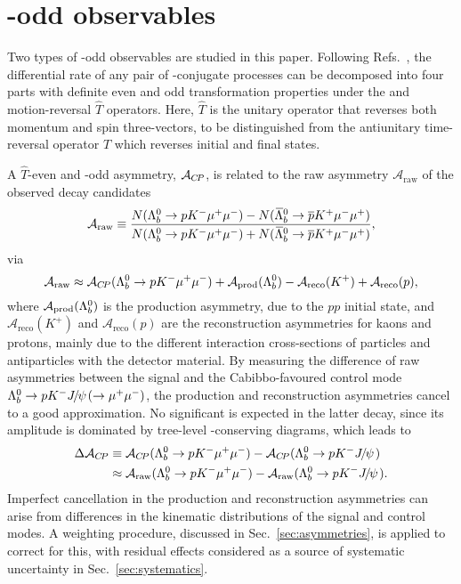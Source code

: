 \section{\boldmath\CP-odd observables}
\label{sec:cpv}
Two types of \CP-odd observables are studied in this paper. Following Refs.~\cite{Durieux:2015zwa,LHCb-PAPER-2016-030}, the differential rate of any pair of \CP-conjugate processes can be decomposed into four parts with definite even and odd transformation properties under the \CP and motion-reversal $\widehat{T}$ operators. Here, $\widehat{T}$ is the unitary operator that reverses both momentum and spin
three-vectors, to be distinguished from the antiunitary time-reversal operator $T$ which reverses initial and final states.

A $\widehat{T}$-even and \CP-odd asymmetry, $\mathcal{A}_{{C\!P}}$, is related to the raw asymmetry $\mathcal{A}_{\text{raw}}$ of the observed decay candidates
\begin{equation}
\mathcal{A}_{\text{raw}} \equiv \frac{N({{\Lambda}^0_{b}} \rightarrow {\ensuremath{p}}{\ensuremath{{K}^-}}{\ensuremath{\mu^+}}{\ensuremath{\mu^-}})-N({{\kern 0.1em\overline{\kern -0.1em\Lambda}}{}^0_{b}} \rightarrow {\ensuremath{\overline {{p}}}}{\ensuremath{{K}^+}}{\ensuremath{\mu^-}}{\ensuremath{\mu^+}} )}{N({{\Lambda}^0_{b}} \rightarrow {\ensuremath{p}}{\ensuremath{{K}^-}}{\ensuremath{\mu^+}}{\ensuremath{\mu^-}})+N({{\kern 0.1em\overline{\kern -0.1em\Lambda}}{}^0_{b}} \rightarrow {\ensuremath{\overline {{p}}}}{\ensuremath{{K}^+}}{\ensuremath{\mu^-}}{\ensuremath{\mu^+}} )},
\end{equation}
via
\begin{equation}
\mathcal{A}_{\text{raw}} \approx \mathcal{A}_{{C\!P}}({{\Lambda}^0_{b}} \rightarrow {\ensuremath{p}}{\ensuremath{{K}^-}}{\ensuremath{\mu^+}}{\ensuremath{\mu^-}}) + \mathcal{A}_{\text{prod}}({{\Lambda}^0_{b}}) - \mathcal{A}_{\text{reco}}(K^+) + \mathcal{A}_{\text{reco}}(p)\label{eq::rawCP},
\end{equation}
where $\mathcal{A}_{\text{prod}}({{\Lambda}^0_{b}})$ is the \Lb production asymmetry, due to the $pp$ initial state, and $\mathcal{A}_{\text{reco}}(K^+)$ and $\mathcal{A}_{\text{reco}}(p)$ are the reconstruction asymmetries for kaons and protons, mainly due to the different interaction cross-sections of particles and antiparticles with the detector material. By measuring the difference of raw asymmetries between the signal and the Cabibbo-favoured control mode ${{\Lambda}^0_{b}} \rightarrow {\ensuremath{p}}{\ensuremath{{K}^-}} {\ensuremath{{J\mskip -3mu/\mskip -2mu\psi\mskip 2mu}}}(\rightarrow\mu^+\mu^-)$, the production and reconstruction asymmetries cancel to a good approximation. No significant \CPV is expected in the latter decay, since its amplitude is dominated by tree-level \CP-conserving diagrams, which leads to
\begin{equation}
\begin{split}
\DACP &\equiv \mathcal{A}_{\CP}(\LK) - \mathcal{A}_{\CP}(\LKJ)\\
&\approx\mathcal{A}_{\text{raw}}(\LK) -  \mathcal{A}_{\text{raw}}(\LKJ).
\end{split}
\label{eq::DACP}
\end{equation}
Imperfect cancellation in the production and reconstruction asymmetries can arise from differences in the kinematic distributions of the signal and control modes. A weighting procedure, discussed in Sec.~\ref{sec:asymmetries}, is applied to correct for this, with residual effects considered as a source of systematic uncertainty in Sec.~\ref{sec:systematics}.

